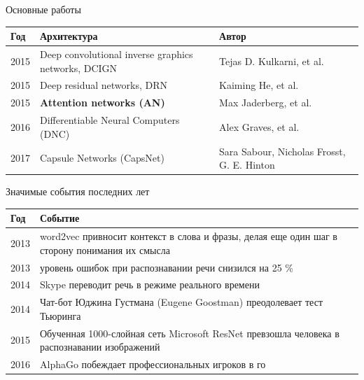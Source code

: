\documentclass{beamer}
\begin{document}
\begin{frame}{Основные работы}
\begin{center}
\begin{tabular}{|p{0.4in}|p{1.5in}|p{1.3in}|}\hline
\textbf{Год}& \textbf{Архитектура} & \textbf{Автор} \\
\hline
2015 & \textsf{Deep convolutional inverse graphics networks, DCIGN} & Tejas D. Kulkarni, et al. \\\hline
2015 & \textsf{Deep residual networks, DRN} & Kaiming He, et al. \\\hline
2015 & \textbf{Attention networks (AN)} & Max Jaderberg, et al. \\\hline
2016 & \textsf{Differentiable Neural Computers (DNC)} & Alex Graves, et al. \\\hline
2017 & \textsf{Capsule Networks (CapsNet)} & Sara Sabour, Nicholas Frosst, G. E. Hinton \\\hline
\end{tabular}
\end{center}
\end{frame}


\begin{frame}{Значимые события последних лет}
\begin{center}
\begin{tabular}{|p{0.4in}|p{3.5in}|}\hline
\textbf{Год}& \textbf{Событие} \\
\hline
2013 & \textsf{word2vec привносит контекст в слова и фразы, делая еще один шаг в сторону понимания их смысла} \\\hline
2013 & \textsf{уровень ошибок при распознавании речи снизился на 25 \%} \\\hline
2014 & \textsf{Skype переводит речь в режиме реального времени} \\\hline
2014 & \textsf{Чат-бот Юджина Густмана (Eugene Goostman) преодолевает тест Тьюринга} \\\hline
2015 & \textsf{Обученная 1000-слойная сеть Microsoft ResNet превзошла человека в распознавании
изображений} \\\hline
2016 & \textsf{AlphaGo побеждает профессиональных игроков в го} \\\hline
\end{tabular}
\end{center}
\end{frame}
\end{document}
